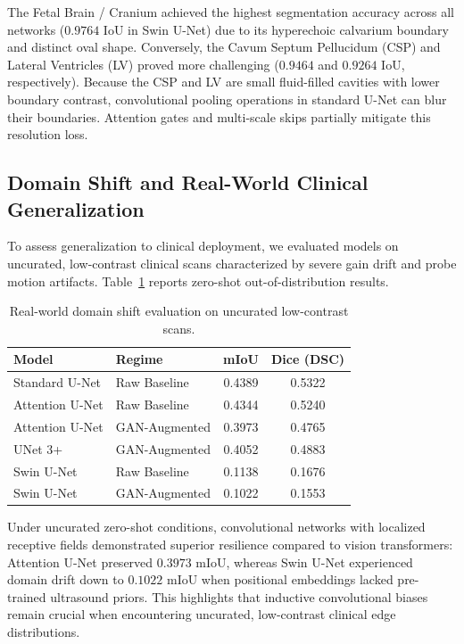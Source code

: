 \documentclass[conference]{IEEEtran}
\begin{document}
The Fetal Brain / Cranium achieved the highest segmentation accuracy across all networks ($0.9764$ IoU in Swin U-Net) due to its hyperechoic calvarium boundary and distinct oval shape. Conversely, the Cavum Septum Pellucidum (CSP) and Lateral Ventricles (LV) proved more challenging ($0.9464$ and $0.9264$ IoU, respectively). Because the CSP and LV are small fluid-filled cavities with lower boundary contrast, convolutional pooling operations in standard U-Net can blur their boundaries. Attention gates and multi-scale skips partially mitigate this resolution loss.

\subsection{Domain Shift and Real-World Clinical Generalization}
To assess generalization to clinical deployment, we evaluated models on uncurated, low-contrast clinical scans characterized by severe gain drift and probe motion artifacts. Table~\ref{tab:domain_shift} reports zero-shot out-of-distribution results.

\begin{table}[htbp]
\caption{Real-world domain shift evaluation on uncurated low-contrast scans.}
\label{tab:domain_shift}
\centering
\small
\begin{tabularx}{\columnwidth}{lXcc}
\toprule
\textbf{Model} & \textbf{Regime} & \textbf{mIoU} & \textbf{Dice (DSC)} \\
\midrule
Standard U-Net   & Raw Baseline        & 0.4389 & 0.5322 \\
Attention U-Net  & Raw Baseline        & 0.4344 & 0.5240 \\
Attention U-Net  & GAN-Augmented       & 0.3973 & 0.4765 \\
UNet 3+          & GAN-Augmented       & 0.4052 & 0.4883 \\
Swin U-Net       & Raw Baseline        & 0.1138 & 0.1676 \\
Swin U-Net       & GAN-Augmented       & 0.1022 & 0.1553 \\
\bottomrule
\end{tabularx}
\end{table}

Under uncurated zero-shot conditions, convolutional networks with localized receptive fields demonstrated superior resilience compared to vision transformers: Attention U-Net preserved $0.3973$ mIoU, whereas Swin U-Net experienced domain drift down to $0.1022$ mIoU when positional embeddings lacked pre-trained ultrasound priors. This highlights that inductive convolutional biases remain crucial when encountering uncurated, low-contrast clinical edge distributions.
\end{document}
